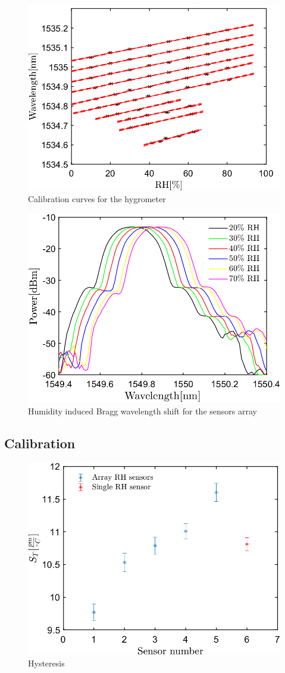 \begin{figure}[!h]
\centering
\includegraphics[width=0.6\columnwidth]{Chapter5/images/RHS.png}
\caption{Calibration curves for the hygrometer}
\label{fig_single_calibration}
\end{figure}


\begin{figure}[!h]
\centering
\includegraphics[width=0.6\columnwidth]{Chapter5/images/rh_array2.png}
\caption{Humidity induced Bragg wavelength shift for the sensors array}
\label{fig_single_calibration}
\end{figure}

\subsection{Calibration}

\begin{figure}[!h]
\centering
\includegraphics[width=0.6\columnwidth]{Chapter5/images/comp.png}
\caption{Hysteresis}
\label{fig_calibration}
\end{figure}


